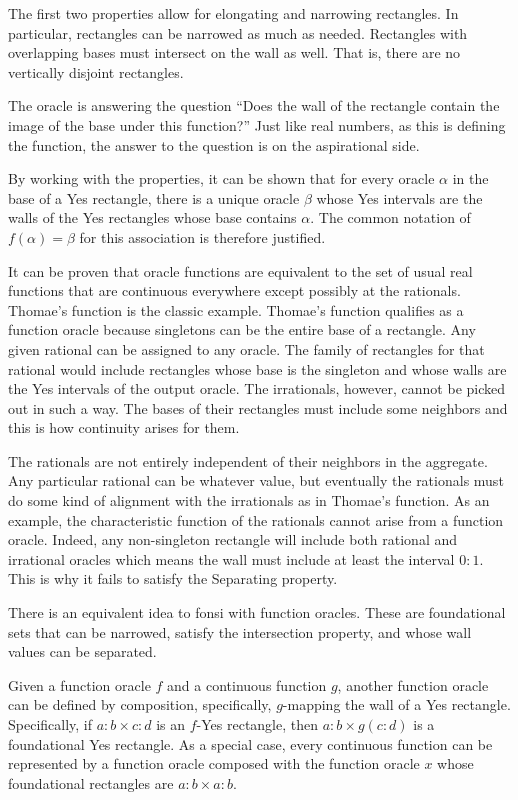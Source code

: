 \documentclass[12pt]{article}
\begin{document}
The first two properties allow for elongating and narrowing rectangles. In particular, rectangles can be narrowed as much as needed. Rectangles with overlapping bases must intersect on the wall as well. That is, there are no vertically disjoint rectangles. 

The oracle is answering the question ``Does the wall of the rectangle contain the image of the base under this function?'' Just like real numbers, as this is defining the function, the answer to the question is on the aspirational side. 

By working with the properties, it can be shown that for every oracle $\alpha$ in the base of a Yes rectangle, there is a unique oracle $\beta$ whose Yes intervals are the walls of the Yes rectangles whose base contains $\alpha$. The common notation of $f(\alpha) = \beta$ for this association is therefore justified. 

It can be proven that oracle functions are equivalent to the set of usual real functions that are continuous everywhere except possibly at the rationals. Thomae's function is the classic example. Thomae's function qualifies as a function oracle because singletons can be the entire base of a rectangle. Any given rational can be assigned to any oracle. The family of rectangles for that rational would include rectangles whose base is the singleton and whose walls are the Yes intervals of the output oracle. The irrationals, however, cannot be picked out in such a way. The bases of their rectangles must include some neighbors and this is how continuity arises for them.

The rationals are not entirely independent of their neighbors in the aggregate. Any particular rational can be whatever value, but eventually the rationals must do some kind of alignment with the irrationals as in Thomae's function. As an example, the characteristic function of the rationals cannot arise from a function oracle. Indeed, any non-singleton rectangle will include both rational and irrational oracles which means the wall must include at least the interval $0:1$. This is why it fails to satisfy the Separating property. 

There is an equivalent idea to fonsi with function oracles. These are foundational sets that can be narrowed, satisfy the intersection property, and whose wall values can be separated. 

Given a function oracle $f$ and a continuous function $g$, another function oracle can be defined by composition, specifically, $g$-mapping the wall of a Yes rectangle. Specifically, if $a:b \times c:d$ is an $f$-Yes rectangle, then $a:b \times g(c:d)$ is a foundational Yes rectangle. As a special case, every continuous function can be represented by a function oracle composed with the function oracle $x$ whose foundational rectangles are $a:b \times a:b$.
\end{document}
